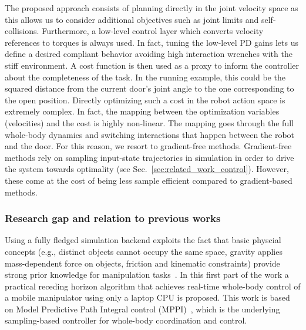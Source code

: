 The proposed approach consists of planning directly in the joint velocity space as this allows us to consider additional objectives such as joint limits and self-collisions. Furthermore, a low-level control layer which converts velocity references to torques is always used. In fact, tuning the low-level PD gains lets us define a desired compliant behavior avoiding high interaction wrenches with the stiff environment. 
A cost function is then used as a proxy to inform the controller about the completeness of the task. In the running example, this could be the squared distance from the current door's joint angle to the one corresponding to the open position. 
Directly optimizing such a cost in the robot action space is extremely complex. In fact, the mapping between the optimization variables (velocities) and the cost is highly non-linear. The mapping goes through the full whole-body dynamics and switching interactions that happen between the robot and the door. For this reason, we resort to gradient-free methods. Gradient-free methods rely on sampling input-state trajectories in simulation in order to drive the system towards optimality (see Sec.~\ref{sec:related_work_control}). However, these come at the cost of being less sample efficient compared to gradient-based methods.

\subsubsection{Research gap and relation to previous works}
Using a fully fledged simulation backend exploits the fact that basic physcial concepts (e.g., distinct objects cannot occupy the same space, gravity applies mass-dependent force on objects, friction and kinematic constraints) provide strong prior knowledge for manipulation tasks~\cite{kroemer2019review}. In this first part of the work a practical receding horizon algorithm that achieves real-time whole-body control of a mobile manipulator using only a laptop CPU is proposed. This work is based on Model Predictive Path Integral control (MPPI)~\cite{williams_information_2017}, which is the underlying sampling-based controller for whole-body coordination and control.

